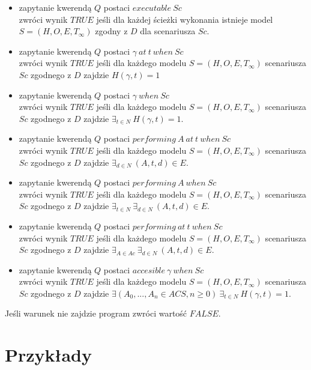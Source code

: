 \begin{itemize}
	\item zapytanie kwerendą $Q$ postaci $executable\ Sc$\\ zwróci wynik $TRUE$ jeśli dla każdej ścieżki wykonania istnieje model $S=(H,O,E,T_{\infty})$ zgodny z $D$ dla scenariusza $Sc$.

	\item zapytanie kwerendą $Q$ postaci $\gamma\ at\ t\ when\ Sc$\\ zwróci wynik $TRUE$ jeśli dla każdego modelu $S=(H,O,E,T_{\infty})$ scenariusza $Sc$ zgodnego z $D$ zajdzie $H(\gamma,t)=1$
	\item zapytanie kwerendą $Q$ postaci $\gamma\ when\ Sc$\\ zwróci wynik $TRUE$ jeśli dla każdego modelu $S=(H,O,E,T_{\infty})$ scenariusza $Sc$ zgodnego z $D$ zajdzie $\exists_{t \in N}\ H(\gamma,t)=1$.

	\item zapytanie kwerendą $Q$ postaci $performing\ A\ at\ t\ when\ Sc$\\ zwróci wynik $TRUE$ jeśli dla każdego modelu $S=(H,O,E,T_{\infty})$ scenariusza $Sc$ zgodnego z $D$ zajdzie $\exists_{d \in N}\ (A,t,d) \in E$.
	\item zapytanie kwerendą $Q$ postaci $performing\ A\ when\ Sc$\\ zwróci wynik $TRUE$ jeśli dla każdego modelu $S=(H,O,E,T_{\infty})$ scenariusza $Sc$ zgodnego z $D$ zajdzie $\exists_{t \in N}\ \exists_{d \in N}\ (A,t,d) \in E$.
	\item zapytanie kwerendą $Q$ postaci $performing\ at\ t\ when\ Sc$\\ zwróci wynik $TRUE$ jeśli dla każdego modelu $S=(H,O,E,T_{\infty})$ scenariusza $Sc$ zgodnego z $D$ zajdzie $\exists_{A \in Ac}\ \exists_{d \in N}\ (A,t,d) \in E$.

	\item zapytanie kwerendą $Q$ postaci $accesible\ \gamma\ when\ Sc$\\ zwróci wynik $TRUE$ jeśli dla każdego modelu $S=(H,O,E,T_{\infty})$ scenariusza $Sc$ zgodnego z $D$ zajdzie $\exists(A_{0},...,A_{n} \in ACS, n \geqslant 0)\  \exists_{t \in N}\ H(\gamma,t)=1$.
\end{itemize}

\begin{remark}
   Jeśli warunek nie zajdzie program zwróci wartość $FALSE$.
\end{remark}
\section{Przykłady}


